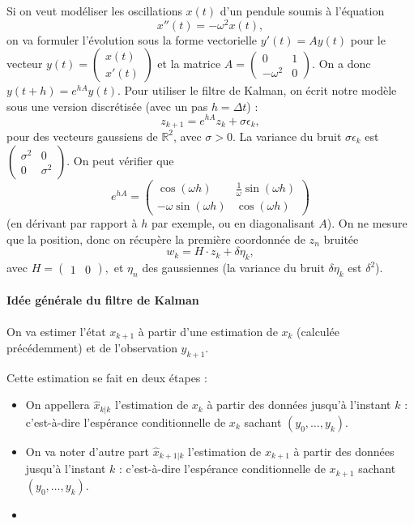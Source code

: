 \documentclass[a4paper,12pt]{book}
\begin{document}
Si on veut modéliser les oscillations $x(t)$ d'un pendule soumis à l'équation
$$x''(t)=-\omega^2 x(t),$$ on va formuler l'évolution sous la forme vectorielle
$y'(t)=Ay(t)$
pour le vecteur $y(t)=\left( \begin{array}{c}
x(t)\\
x'(t)
\end{array}\right)$ et la matrice $A=\left( \begin{array}{cc}
0& 1\\
-\omega^2 & 0
\end{array}\right).$
On a donc $y(t+h)=e^{hA}y(t).$ Pour utiliser le filtre de Kalman, on écrit notre modèle sous une version discrétisée (avec un pas $h=\Delta t$) :
$$z_{k+1}=e^{hA}z_k+\sigma \epsilon_k,$$
pour des vecteurs gaussiens de $\mathbb{R}^2$, avec $\sigma>0$. La  variance du bruit $\sigma\epsilon_k$ est $\left(\begin{array}{cc}
\sigma^2& 0\\
0& \sigma^2
\end{array}\right)$.
On peut vérifier que
$$e^{hA}=\left( \begin{array}{cc}
\cos(\omega h)& \frac{1}{\omega}\sin(\omega h)\\
-\omega \sin(\omega h) & \cos(\omega h)
\end{array}\right)$$
(en dérivant par rapport à $h$ par exemple, ou en diagonalisant $A$). On ne mesure que  la position, donc on récupère la première coordonnée de $z_n$  bruitée
$$w_k =H\cdot z_k+\delta \eta_k,$$
avec
$H= \left(\begin{array}{cc}
1&0
\end{array}\right),$
et $\eta_n$ des gaussiennes (la variance du bruit $\delta \eta_k$ est $\delta^2$).


\paragraph{Idée générale du filtre de Kalman}
On va estimer l'état $x_{k+1}$ à partir d'une estimation de $x_k$ (calculée précédemment) et de l'observation $y_{k+1}$.

Cette estimation se fait en deux étapes :
\begin{itemize}
\item On appellera $\hat{x}_{k|k}$ l'estimation de $x_{k}$ à partir des données jusqu'à l'instant $k$ : c'est-à-dire l'espérance conditionnelle de $x_{k}$ sachant $(y_0,\ldots,y_{k})$.
\item On va noter d'autre part $\hat{x}_{k+1|k}$ l'estimation de $x_{k+1}$ à partir des données jusqu'à l'instant $k$ : c'est-à-dire l'espérance conditionnelle de $x_{k+1}$ sachant $(y_0,\ldots,y_k)$.
\item
\end{itemize}
\end{document}
